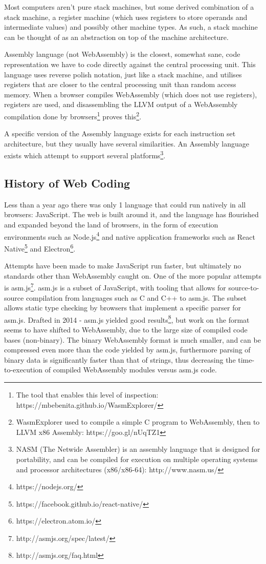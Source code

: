 \documentclass[a4paper]{article}
\begin{document}
Most computers aren't pure stack machines, but some derived combination of a stack machine, a register machine (which uses registers to store operands and intermediate values) and possibly other machine types. As such, a stack machine can be thought of as an abstraction on top of the machine architecture.

Assembly language (not WebAssembly) is the closest, somewhat sane, code representation we have to code directly against the central processing unit. This language uses reverse polish notation, just like a stack machine, and utilises registers that are closer to the central processing unit than random access memory. When a browser compiles WebAssembly (which does not use registers), registers are used, and disassembling the LLVM output of a WebAssembly compilation done by browsers\footnote{The tool that enables this level of inspection: https://mbebenita.github.io/WasmExplorer/} proves this\footnote{WasmExplorer used to compile a simple C program to WebAssembly, then to LLVM x86 Assembly: https://goo.gl/nUqTZ1}.

A specific version of the Assembly language exists for each instruction set architecture, but they usually have several similarities. An Assembly language exists which attempt to support several platforms\footnote{NASM (The Netwide Assembler) is an assembly language that is designed for portability, and can be compiled for execution on multiple operating systems and processor architectures (x86/x86-64): http://www.nasm.us/}.

\newpage
\subsection{History of Web Coding}
\label{sec:problem-analysis:history}
Less than a year ago there was only 1 language that could run natively in all browsers: JavaScript. The web is built around it, and the language has flourished and expanded beyond the land of browsers, in the form of execution environments such as Node.js\footnote{https://nodejs.org/} and native application frameworks such as React Native\footnote{https://facebook.github.io/react-native/} and Electron\footnote{https://electron.atom.io/}.

Attempts have been made to make JavaScript run faster, but ultimately no standards other than WebAssembly caught on. One of the more popular attempts is asm.js\footnote{http://asmjs.org/spec/latest/}. asm.js is a subset of JavaScript, with tooling that allows for source-to-source compilation from languages such as C and C++ to asm.js. The subset allows static type checking by browsers that implement a specific parser for asm.js. Drafted in 2014 - asm.js yielded good results\footnote{http://asmjs.org/faq.html}, but work on the format seems to have shifted to WebAssembly, due to the large size of compiled code bases (non-binary). The binary WebAssembly format is much smaller, and can be compressed even more than the code yielded by asm.js, furthermore parsing of binary data is significantly faster than that of strings, thus decreasing the time-to-execution of compiled WebAssembly modules versus asm.js code.
\end{document}

